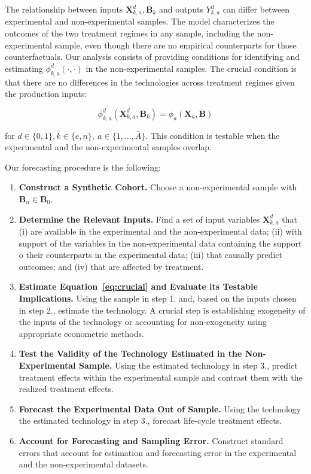 The relationship between inputs $\bm{X}^d_{k,a}, \bm{B}_k$ and outputs $Y^d_{k,a}$ can differ between experimental and non-experimental samples. The model characterizes the outcomes of the two treatment regimes in any sample, including the non-experimental sample, even though there are no empirical counterparts for those counterfactuals. Our analysis consists of providing conditions for identifying and estimating $\phi^d_{k,a}\left( \cdot, \cdot \right)$ in the non-experimental samples. The crucial condition is that there are no differences in the technologies across treatment regimes given the production inputs: 

\begin{equation}
\phi^d_{k,a} (\bm{X}^d_{k,a}, \bm{B}_k) = \phi_{a} (\bm{X}_{a}, \bm{B}) \label{eq:crucial}
\end{equation}

\noindent for $d \in\{0,1\},  k\in\{e,n\}, \  a\in\{1,\dots,\bar{A}\}$. This condition is testable when the experimental and the non-experimental samples overlap.

Our forecasting procedure is the following: 

\begin{enumerate}
\item \textbf{Construct a Synthetic Cohort.} Choose a non-experimental sample with $\bm{B}_n \in \bm{B}_0$.
\item \textbf{Determine the Relevant Inputs.} Find a set of input variables $\bm{X}^d_{k,a}$ that (i) are available in the experimental and the non-experimental data; (ii) with support of the variables in the non-experimental data containing the support o their counterparts in the experimental data; (iii) that causally predict outcomes; and (iv) that are affected by treatment.
\item \textbf{Estimate Equation~\eqref{eq:crucial} and Evaluate its Testable Implications.} Using the sample in step 1. and, based on the inputs chosen in step 2., estimate the technology. A crucial step is establishing exogeneity of the inputs of the technology or accounting for non-exogeneity using appropriate econometric methods.
\item \textbf{Test the Validity of the Technology Estimated in the Non-Experimental Sample.} Using the estimated technology in step 3., predict treatment effects within the experimental sample and contrast them with the realized treatment effects.
\item \textbf{Forecast the Experimental Data Out of Sample.} Using the technology the estimated technology in step 3., forecast life-cycle treatment effects. 
\item \textbf{Account for Forecasting and Sampling Error.} Construct standard errors that account for estimation and forecasting error in the experimental and the non-experimental datasets.
\end{enumerate}

